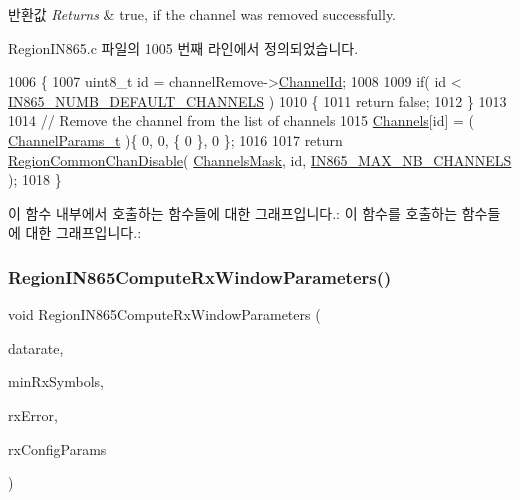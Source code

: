 \begin{DoxyRetVals}{반환값}
{\em Returns} & true, if the channel was removed successfully. \\
\hline
\end{DoxyRetVals}


Region\+I\+N865.\+c 파일의 1005 번째 라인에서 정의되었습니다.


\begin{DoxyCode}
1006 \{
1007     uint8\_t \textcolor{keywordtype}{id} = channelRemove->\mbox{\hyperlink{structs_channel_remove_params_ae23f953dc29c360e56a3c856404a3276}{ChannelId}};
1008 
1009     \textcolor{keywordflow}{if}( \textcolor{keywordtype}{id} < \mbox{\hyperlink{group___r_e_g_i_o_n_i_n865_ga166b325d6a142fe02d403487b708fcbb}{IN865\_NUMB\_DEFAULT\_CHANNELS}} )
1010     \{
1011         \textcolor{keywordflow}{return} \textcolor{keyword}{false};
1012     \}
1013 
1014     \textcolor{comment}{// Remove the channel from the list of channels}
1015     \mbox{\hyperlink{_region_i_n865_8c_adad6dcb99199b5142166021a8aac9aa2}{Channels}}[id] = ( \mbox{\hyperlink{group___l_o_r_a_m_a_c_ga1360ca6f82c6d125ea43a9dad9b56184}{ChannelParams\_t}} )\{ 0, 0, \{ 0 \}, 0 \};
1016 
1017     \textcolor{keywordflow}{return} \mbox{\hyperlink{group___r_e_g_i_o_n_c_o_m_m_o_n_ga695c0ab2a06edcae5b33772f639fb676}{RegionCommonChanDisable}}( \mbox{\hyperlink{_region_i_n865_8c_a2188957b5ca6af8092154d7ccbfa5757}{ChannelsMask}}, \textcolor{keywordtype}{id}, 
      \mbox{\hyperlink{group___r_e_g_i_o_n_i_n865_ga6fbcf463cb8df05984d576d96383651d}{IN865\_MAX\_NB\_CHANNELS}} );
1018 \}
\end{DoxyCode}
이 함수 내부에서 호출하는 함수들에 대한 그래프입니다.\+:
이 함수를 호출하는 함수들에 대한 그래프입니다.\+:
\mbox{\label{group___r_e_g_i_o_n_i_n865_ga66be427601e7105b522c36160c8513a7}} 
\subsubsection{\texorpdfstring{Region\+I\+N865\+Compute\+Rx\+Window\+Parameters()}{RegionIN865ComputeRxWindowParameters()}}
{\footnotesize\ttfamily void Region\+I\+N865\+Compute\+Rx\+Window\+Parameters (\begin{DoxyParamCaption}\item[{int8\+\_\+t}]{datarate,  }\item[{uint8\+\_\+t}]{min\+Rx\+Symbols,  }\item[{uint32\+\_\+t}]{rx\+Error,  }\item[{\mbox{\hyperlink{group___r_e_g_i_o_n_ga375c038078dfcfc7ef14280021db719e}{Rx\+Config\+Params\+\_\+t}} $\ast$}]{rx\+Config\+Params }\end{DoxyParamCaption})}

